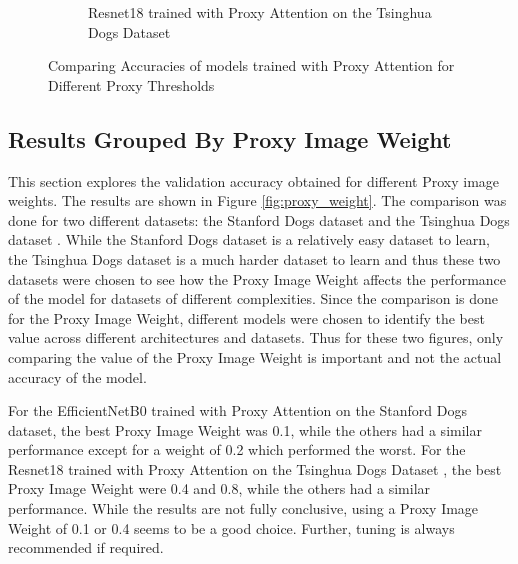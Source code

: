 \begin{figure}[!htb]
\begin{subfigure}[h]{.5\textwidth}
        \caption{Resnet18 \cite{heDeepResidualLearning2016} trained with Proxy Attention on the Tsinghua Dogs Dataset \cite{zouNewDatasetDog2020}}
    \end{subfigure}
    
    \caption{Comparing Accuracies of models trained with Proxy Attention for Different Proxy Thresholds}
    \label{fig:proxy_threshold}
\end{figure}

\subsection{Results Grouped By Proxy Image Weight}
This section explores the validation accuracy obtained for different Proxy image weights. The results are shown in Figure \ref{fig:proxy_weight}. 
The comparison was done for two different datasets: the Stanford Dogs dataset \cite{khoslaNovelDatasetFineGrained} and the Tsinghua Dogs dataset \cite{zouNewDatasetDog2020}. While the Stanford Dogs dataset is a relatively easy dataset to learn, the Tsinghua Dogs dataset is a much harder dataset to learn and thus these two datasets were chosen to see how the Proxy Image Weight affects the performance of the model for datasets of different complexities. Since the comparison is done for the Proxy Image Weight, different models were chosen to identify the best value across different architectures and datasets. Thus for these two figures, only comparing the value of the Proxy Image Weight is important and not the actual accuracy of the model.

For the EfficientNetB0 \cite{tanEfficientnetRethinkingModel2019} trained with Proxy Attention on the Stanford Dogs dataset\cite{khoslaNovelDatasetFineGrained}, the best Proxy Image Weight was 0.1, while the others had a similar performance except for a weight of 0.2 which performed the worst. For the Resnet18 \cite{heDeepResidualLearning2016} trained with Proxy Attention on the Tsinghua Dogs Dataset \cite{zouNewDatasetDog2020}, the best Proxy Image Weight were 0.4 and 0.8, while the others had a similar performance.
While the results are not fully conclusive, using a Proxy Image Weight of 0.1 or 0.4 seems to be a good choice. Further, tuning is always recommended if required.

